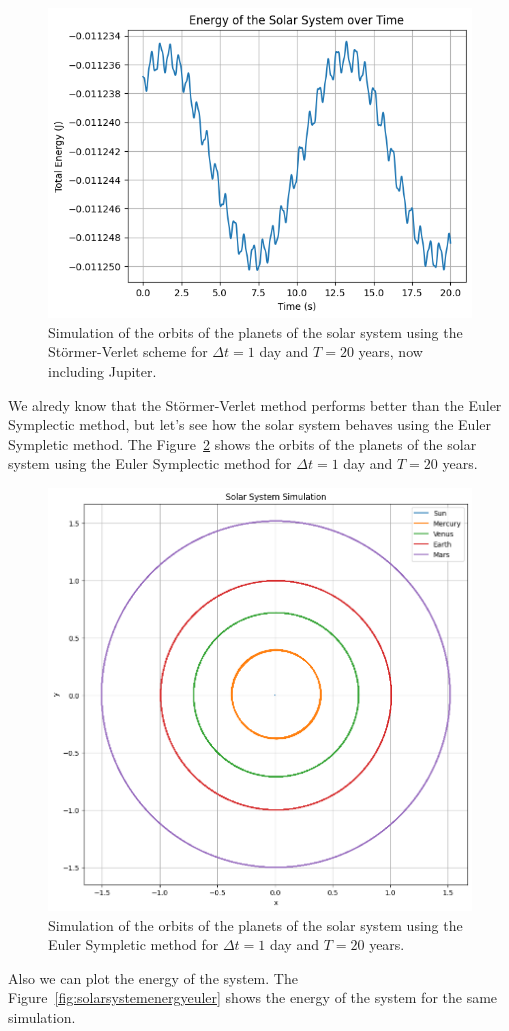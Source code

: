 \documentclass{article}
\begin{document}
\begin{figure}[H]
	\centering
	\includegraphics[width=0.5\linewidth]{./Figures/SolarSystem/orbitsjupiter.png}
	\caption{Simulation of the orbits of the planets of the solar system using the Störmer-Verlet scheme for \(\Delta t = 1\) day and \(T = 20\) years, now including Jupiter.}
	\label{fig:solarsystemjupiter}
\end{figure}


\label{sec:using_symplectic_euler_method}

We alredy know that the Störmer-Verlet method performs better than the Euler Symplectic method, but let's see how the solar system behaves using the Euler Sympletic method. The Figure~\ref{fig:solarsystemeuler} shows the orbits of the planets of the solar system using the Euler Symplectic method for \(\Delta t = 1\) day and \(T = 20\) years.

\begin{figure}[H]
	\centering
	\includegraphics[width=0.5\linewidth]{./Figures/SolarSystem/orbits_euler.png}
	\caption{Simulation of the orbits of the planets of the solar system using the Euler Sympletic method for \(\Delta t = 1\) day and \(T = 20\) years.}
	\label{fig:solarsystemeuler}
\end{figure}

Also we can plot the energy of the system. The Figure~\ref{fig:solarsystemenergyeuler} shows the energy of the system for the same simulation.
\end{document}
